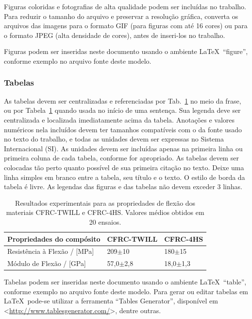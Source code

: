 \documentclass[%
  article,%
  10pt,%
  a4paper,%
  fleqn,%
  oneside,%
  sumario = tradicional,%
  chapter = TITLE,%
  section = TITLE,%
]{abntex2}
\begin{document}
Figuras coloridas e fotografias de alta qualidade podem ser incluídas no trabalho. Para reduzir o tamanho do arquivo e preservar a resolução gráfica, converta os arquivos das imagens para o formato GIF (para figuras com até 16 cores) ou para o formato JPEG (alta densidade de cores), antes de inseri-los no trabalho.

Figuras podem ser inseridas neste documento usando o ambiente \LaTeX\ ``figure'', conforme exemplo no arquivo fonte deste modelo.

\subsubsection{Tabelas}\label{sssec:tabs}

As tabelas devem ser centralizadas e referenciadas por Tab.~\ref{tab:resexp} no meio da frase, ou por Tabela~\ref{tab:resexp} quando usada no início de uma sentença. Sua legenda deve ser centralizada e localizada imediatamente acima da tabela. Anotações e valores numéricos nela incluídos devem ter tamanhos compatíveis com o da fonte usado no texto do trabalho, e todas as unidades devem ser expressas no Sistema Internacional (SI). As unidades devem ser incluídas apenas na primeira linha ou primeira coluna de cada tabela, conforme for apropriado. As tabelas devem ser colocadas tão perto quanto possível de sua primeira citação no texto. Deixe uma linha simples em branco entre a tabela, seu título e o texto. O estilo de borda da tabela é livre. As legendas das figuras e das tabelas não devem exceder 3 linhas.

\begin{table}[!htb]
\centering
\caption{Resultados experimentais para as propriedades de flexão dos materiais CFRC-TWILL e CFRC-4HS. Valores médios obtidos em 20 ensaios.}
\label{tab:resexp}
\begin{tabular*}{\textwidth}{@{\extracolsep{\fill}}lll}
\hline
Propriedades do compósito    & CFRC-TWILL    & CFRC-4HS     \\ \hline
Resistência à Flexão / [MPa] & 209$\pm$10    & 180$\pm$15   \\
Módulo de Flexão / [GPa]     & 57,0$\pm$2,8  & 18,0$\pm$1,3 \\ \hline
\end{tabular*}
\end{table}

Tabelas podem ser inseridas neste documento usando o ambiente \LaTeX\ ``table'', conforme exemplo no arquivo fonte deste modelo. Para gerar ou editar tabelas em \LaTeX\ pode-se utilizar a ferramenta ``Tables Generator'', disponível em <\url{http://www.tablesgenerator.com/}>, dentre outras.
\end{document}
